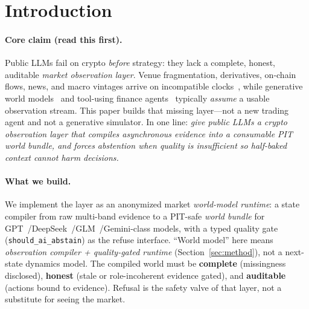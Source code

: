 \documentclass[sigconf,anonymous]{acmart}
\theoremstyle{acmdefinition}%
\theoremstyle{acmplain}%
\begin{document}


\maketitle

\section{Introduction}
\label{sec:intro}

\paragraph{Core claim (read this first).}
Public LLMs fail on crypto \emph{before} strategy: they lack a complete, honest, auditable \emph{market observation layer}.
Venue fragmentation, derivatives, on-chain flows, news, and macro vintages arrive on incompatible clocks~\cite{makarov2020,liu2022}, while generative world models~\cite{ha2018world,hafner2020dreamer,lecun2022path} and tool-using finance agents~\cite{yao2023react,yu2023finmem,zhang2024finagent} typically \emph{assume} a usable observation stream.
This paper builds that missing layer---not a new trading agent and not a generative simulator.
In one line: \emph{give public LLMs a crypto observation layer that compiles asynchronous evidence into a consumable PIT world bundle, and forces abstention when quality is insufficient so half-baked context cannot harm decisions.}

\paragraph{What we build.}
We implement the layer as an anonymized market \emph{world-model runtime}: a state compiler from raw multi-band evidence to a PIT-safe \emph{world bundle} for GPT~/DeepSeek~/GLM~/Gemini-class models, with a typed quality gate (\texttt{should\_ai\_abstain}) as the refuse interface.
``World model'' here means \emph{observation compiler + quality-gated runtime} (Section~\ref{sec:method}), not a next-state dynamics model.
The compiled world must be \textbf{complete} (missingness disclosed), \textbf{honest} (stale or role-incoherent evidence gated), and \textbf{auditable} (actions bound to evidence). Refusal is the safety valve of that layer, not a substitute for seeing the market.
\end{document}
